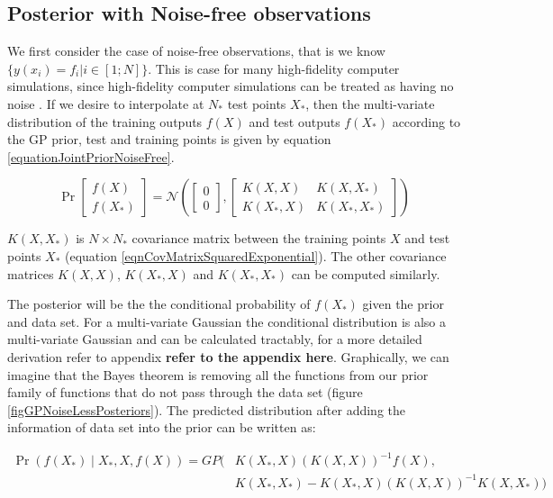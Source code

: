 \subsection{Posterior with Noise-free observations}\label{subSecPosteriorNoiseFree}
We first consider the case of noise-free observations, that is we know $\{y(x_{i}) = f_{i} | i \in [1; N] \}$. This is case for many high-fidelity computer simulations, since high-fidelity computer simulations can be treated as having no noise \cite{sacks1989design}. If we desire to interpolate at $N_{*}$ test points $X_{*}$, then the multi-variate distribution of the training outputs $f(X)$ and test outputs $f(X_{*})$ according to the GP prior, test and training points is given by equation \ref{equationJointPriorNoiseFree}.

\begin{equation}\label{equationJointPriorNoiseFree}
\Pr\left [ \begin{matrix}
f(X)
\\ f(X_{*})
\end{matrix} \right ] = 
\mathcal{N}\left (\left [ \begin{matrix} 0 \\ 0 \end{matrix} \right ]
, 
\left [ \begin{matrix}
K(X, X) & K(X, X_{*})\\ 
K(X_{*}, X) & K(X_{*}, X_{*})
\end{matrix} \right ]
\right)
\end{equation}

$K(X, X_{*})$ is $N \times N_{*}$ covariance matrix between the training points $X$ and test points $X_{*}$ (equation \ref{eqnCovMatrixSquaredExponential}). The other covariance matrices $K(X, X)$, $K(X_{*}, X)$ and $K(X_{*}, X_{*})$ can be computed similarly. 

The posterior will be the the conditional probability of $f(X_{*})$ given the prior and data set. For a multi-variate Gaussian the conditional distribution is also a multi-variate Gaussian and can be calculated tractably, for a more detailed derivation refer to appendix \textbf{refer to the appendix here}. Graphically, we can imagine that the Bayes theorem is removing all the functions from our prior family of functions that do not pass through the data set (figure \ref{figGPNoiseLessPosteriors}). The predicted distribution after adding the information of data set into the prior can be written as:

  \begin{equation}\label{eqNoiseFreePosteriorGP}
  \begin{aligned}
  \Pr(f(X_{*}) \mid X_{*}, X, f(X)) = GP(  & K(X_{*}, X)( K(X, X) )^{-1}f(X),   \\ 
                                & K(X_{*}, X_{*}) - K(X_{*}, X)( K(X, X) )^{-1} K(X, X_{*}))
  \end{aligned}
  \end{equation}

